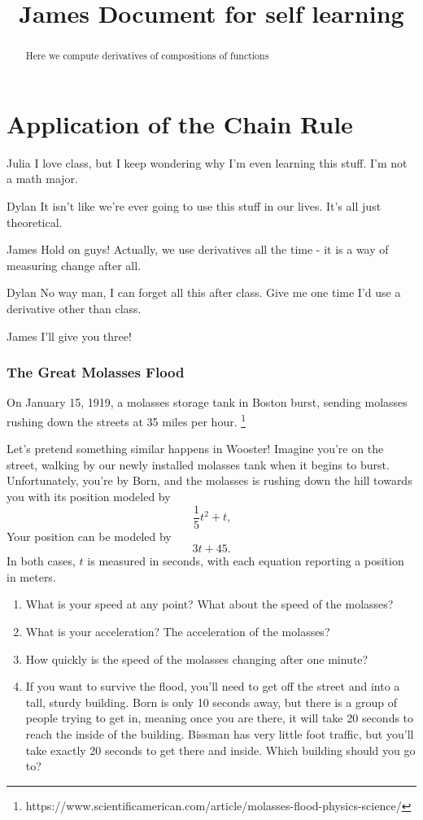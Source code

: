 \documentclass{ximera}
\begin{document}
\title{James Document for self learning}
\section{Application of the Chain Rule}

\begin{dialogue}
\item[Julia] I love class, but I keep wondering why I'm even learning this stuff. I'm not a math major.
\item[Dylan] It isn't like we're ever going to use this stuff in our lives. It's all just theoretical.
\item[James] Hold on guys! Actually, we use derivatives all the time - it is a way of measuring change after all.
\item[Dylan] No way man, I can forget all this after class. Give me one time I'd use a derivative other than class.
\item[James] I'll give you three!
\end{dialogue}

\begin{abstract}
  Here we compute derivatives of compositions of functions
\end{abstract}
\maketitle

\subsubsection{The Great Molasses Flood}
On January 15, 1919, a molasses storage tank in Boston burst, sending molasses rushing down the streets at 35 miles per hour. \footnote{https://www.scientificamerican.com/article/molasses-flood-physics-science/}

Let's pretend something similar happens in Wooster! Imagine you're on the street, walking by our newly installed molasses tank when it begins to burst. Unfortunately, you're by Born, and the molasses is rushing down the hill towards you with its position modeled by $$\frac{1}{5}t^2+t \text{,}$$ Your position can be modeled by $$3t+45 \text{.}$$ In both cases, $t$ is measured in seconds, with each equation reporting a position in meters.

\begin{enumerate}
\item{What is your speed at any point? What about the speed of the molasses?}
\item{What is your acceleration? The acceleration of the molasses?}
\item{How quickly is the speed of the molasses changing after one minute?}
\item{If you want to survive the flood, you'll need to get off the street and into a tall, sturdy building. Born is only 10 seconds away, but there is a group of people trying to get in, meaning once you are there, it will take 20 seconds to reach the inside of the building. Bissman has very little foot traffic, but you'll take exactly 20 seconds to get there and inside. Which building should you go to?}
\end{enumerate}
\end{document}
